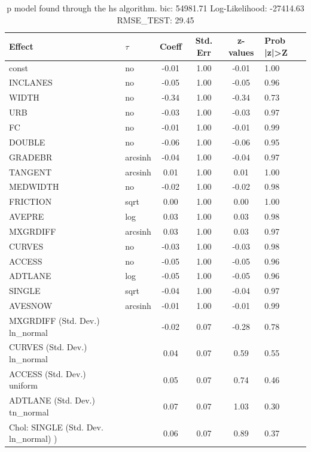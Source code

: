\begin{table}
	\caption{p model found through the hs algorithm. bic: 54981.71 Log-Likelihood: -27414.63 RMSE_TEST: 29.45}
	\begin{center}
		\begin{tabular}{|l|l|c|c|c|l|}
			\hline
			Effect & $\tau$ & Coeff & Std. Err & z-values & Prob |z|>Z \\
			\hline
			const & no & -0.01 & 1.00 & -0.01 & 1.00 \\
			\hline
			INCLANES & no & -0.05 & 1.00 & -0.05 & 0.96 \\
			\hline
			WIDTH & no & -0.34 & 1.00 & -0.34 & 0.73 \\
			\hline
			URB & no & -0.03 & 1.00 & -0.03 & 0.97 \\
			\hline
			FC & no & -0.01 & 1.00 & -0.01 & 0.99 \\
			\hline
			DOUBLE & no & -0.06 & 1.00 & -0.06 & 0.95 \\
			\hline
			GRADEBR & arcsinh & -0.04 & 1.00 & -0.04 & 0.97 \\
			\hline
			TANGENT & arcsinh & 0.01 & 1.00 & 0.01 & 1.00 \\
			\hline
			MEDWIDTH & no & -0.02 & 1.00 & -0.02 & 0.98 \\
			\hline
			FRICTION & sqrt & 0.00 & 1.00 & 0.00 & 1.00 \\
			\hline
			AVEPRE & log & 0.03 & 1.00 & 0.03 & 0.98 \\
			\hline
			MXGRDIFF & arcsinh & 0.03 & 1.00 & 0.03 & 0.97 \\
			\hline
			CURVES & no & -0.03 & 1.00 & -0.03 & 0.98 \\
			\hline
			ACCESS & no & -0.05 & 1.00 & -0.05 & 0.96 \\
			\hline
			ADTLANE & log & -0.05 & 1.00 & -0.05 & 0.96 \\
			\hline
			SINGLE & sqrt & -0.04 & 1.00 & -0.04 & 0.97 \\
			\hline
			AVESNOW & arcsinh & -0.01 & 1.00 & -0.01 & 0.99 \\
			\hline
			MXGRDIFF (Std. Dev.) ln_normal &  & -0.02 & 0.07 & -0.28 & 0.78 \\
			\hline
			CURVES (Std. Dev.) ln_normal &  & 0.04 & 0.07 & 0.59 & 0.55 \\
			\hline
			ACCESS (Std. Dev.) uniform &  & 0.05 & 0.07 & 0.74 & 0.46 \\
			\hline
			ADTLANE (Std. Dev.) tn_normal &  & 0.07 & 0.07 & 1.03 & 0.30 \\
			\hline
			 Chol: SINGLE (Std. Dev. ln_normal) ) &  & 0.06 & 0.07 & 0.89 & 0.37 \\

\end{tabular}
\end{center}
\end{table}
